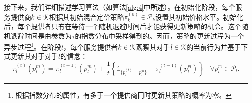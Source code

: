 接下来，我们详细描述学习算法（如算法\ref{alg:4}中所述）。在初始化阶段，每个服务提供商$k\in\mathcal{K}$根据其初始混合定价策略$\pi_k^{(0)}\in\mathcal{P}_k$设置其初始价格水平。初始化后，每个提供者只有在等待一个随机退避时间后才能获得更新策略的机会。这个随机退避时间是由参数为$\tau$的指数分布中采样得到的。因而，策略的更新过程为一个异步过程\footnote{根据指数分布的属性，有多于一个提供商同时更新其策略的概率为零。}。在阶段$t$，每个服务提供者$k\in\mathcal{K}$观察其对手$l\in\mathcal{K}$的当前行为并基于下式更新其对于对手$l$的信念：
\begin{equation}\label{eq:belief}
\pi_l^{(t)}(p_l^m)=\pi_l^{(t-1)}(p_l^m)+\frac{1}{t}\left\{\mathds{1}_{\{p_l^{(t)}=p_l^m\}}-\pi_l^{(t-1)}(p_l^m)\right\},~~\forall p^m_l\in\mathcal{P}_l.
\end{equation}

